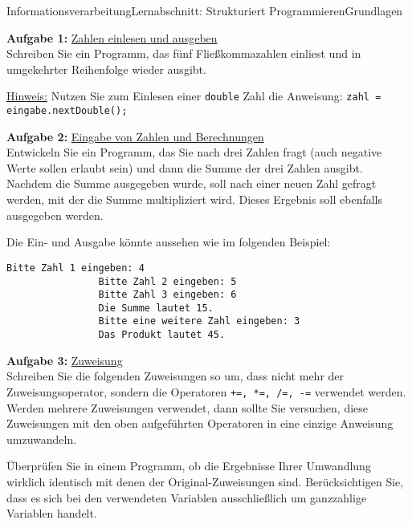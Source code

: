 \documentclass[oneside,openany,headings=optiontotoc,11pt,numbers=noenddot]{scrreprt}
\begin{document}
	\begin{worksheet}{Informationsverarbeitung}{Lernabschnitt: Strukturiert Programmieren}{Grundlagen}	
		\noindent
		\sffamily
		\begin{framed}
			\noindent
			\textbf{Aufgabe 1:} \underline{Zahlen einlesen und ausgeben}\\
			Schreiben Sie ein Programm, das fünf Fließkommazahlen einliest und in umgekehrter Reihenfolge wieder ausgibt.\\
			\par\noindent
			\underline{Hinweis:} Nutzen Sie zum Einlesen einer \lstinline[style=JavaInputStyle]|double| Zahl die Anweisung: \lstinline[style=JavaInputStyle]|zahl = eingabe.nextDouble();|\\
			\par\noindent
			\textbf{Aufgabe 2:} \underline{Eingabe von Zahlen und Berechnungen}\\
			Entwickeln Sie ein Programm, das Sie nach drei Zahlen fragt (auch negative Werte sollen erlaubt sein) und dann die Summe der drei Zahlen ausgibt. Nachdem die Summe ausgegeben wurde, soll nach einer neuen Zahl gefragt werden, mit der die Summe multipliziert wird. Dieses Ergebnis soll ebenfalls ausgegeben werden.\\
			\par\noindent
			Die Ein- und Ausgabe könnte aussehen wie im folgenden Beispiel:
			\begin{lstlisting}[style=JavaInputStyle]
				Bitte Zahl 1 eingeben: 4
				Bitte Zahl 2 eingeben: 5
				Bitte Zahl 3 eingeben: 6
				Die Summe lautet 15.
				Bitte eine weitere Zahl eingeben: 3
				Das Produkt lautet 45.
			\end{lstlisting}
			\textbf{Aufgabe 3:} \underline{Zuweisung}\\
			Schreiben Sie die folgenden Zuweisungen so um, dass nicht mehr der Zuweisungsoperator, sondern die Operatoren \lstinline[style=JavaInputStyle]|+=, *=, /=, -=| verwendet werden.\\
			Werden mehrere Zuweisungen verwendet, dann sollte Sie versuchen, diese Zuweisungen mit den oben aufgeführten Operatoren in eine einzige Anweisung umzuwandeln.\\
			\par\noindent
			Überprüfen Sie in einem Programm, ob die Ergebnisse Ihrer Umwandlung wirklich identisch mit denen der Original-Zuweisungen sind. Berücksichtigen Sie, dass es sich bei den verwendeten Variablen ausschließlich um ganzzahlige Variablen handelt.\\

\end{framed}
\end{worksheet}
\end{document}
